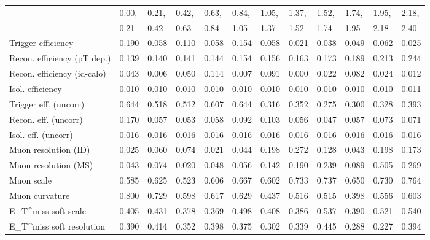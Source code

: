 \begin{tabular}{l|p{0.6cm}p{0.6cm}p{0.6cm}p{0.6cm}p{0.6cm}p{0.6cm}p{0.6cm}p{0.6cm}p{0.6cm}p{0.6cm}p{0.6cm}}
\hline
   & 0.00, & 0.21, & 0.42, & 0.63, & 0.84, & 1.05, & 1.37, & 1.52, & 1.74, & 1.95, & 2.18,  \\ 
   & 0.21 & 0.42 & 0.63 & 0.84 & 1.05 & 1.37 & 1.52 & 1.74 & 1.95 & 2.18 & 2.40  \\ 
\hline
Trigger efficiency                       & 0.190 & 0.058 & 0.110 & 0.058 & 0.154 & 0.058 & 0.021 & 0.038 & 0.049 & 0.062 & 0.025 \\
Recon. efficiency (pT dep.)              & 0.139 & 0.140 & 0.141 & 0.144 & 0.154 & 0.156 & 0.163 & 0.173 & 0.189 & 0.213 & 0.244 \\
Recon. efficiency (id-calo)              & 0.043 & 0.006 & 0.050 & 0.114 & 0.007 & 0.091 & 0.000 & 0.022 & 0.082 & 0.024 & 0.012 \\
Isol. efficiency                         & 0.010 & 0.010 & 0.010 & 0.010 & 0.010 & 0.010 & 0.010 & 0.010 & 0.010 & 0.010 & 0.011 \\
Trigger eff. (uncorr)                    & 0.644 & 0.518 & 0.512 & 0.607 & 0.644 & 0.316 & 0.352 & 0.275 & 0.300 & 0.328 & 0.393 \\
Recon. eff. (uncorr)                     & 0.170 & 0.057 & 0.053 & 0.058 & 0.092 & 0.103 & 0.056 & 0.047 & 0.057 & 0.073 & 0.071 \\
Isol. eff. (uncorr)                      & 0.016 & 0.016 & 0.016 & 0.016 & 0.016 & 0.016 & 0.016 & 0.016 & 0.016 & 0.016 & 0.016 \\
Muon resolution (ID)                     & 0.025 & 0.060 & 0.074 & 0.021 & 0.044 & 0.198 & 0.272 & 0.128 & 0.043 & 0.198 & 0.173 \\
Muon resolution (MS)                     & 0.043 & 0.074 & 0.020 & 0.048 & 0.056 & 0.142 & 0.190 & 0.239 & 0.089 & 0.505 & 0.269 \\
Muon scale                               & 0.585 & 0.625 & 0.523 & 0.606 & 0.667 & 0.602 & 0.733 & 0.737 & 0.650 & 0.730 & 0.764 \\
Muon curvature                           & 0.800 & 0.729 & 0.598 & 0.617 & 0.629 & 0.437 & 0.516 & 0.515 & 0.398 & 0.556 & 0.603 \\
E_{T}^{miss} soft scale                  & 0.405 & 0.431 & 0.378 & 0.369 & 0.498 & 0.408 & 0.386 & 0.537 & 0.390 & 0.521 & 0.540 \\
E_{T}^{miss} soft resolution             & 0.390 & 0.414 & 0.352 & 0.398 & 0.375 & 0.302 & 0.339 & 0.445 & 0.288 & 0.227 & 0.394 \\

\end{tabular}
